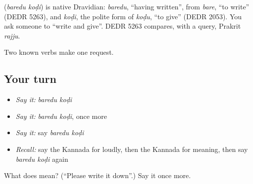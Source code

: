 \begin{cousinweb}
\textbf{ } (\emph{baredu koḍi}) is native Dravidian: \emph{baredu}, \textquotedblleft{}having written\textquotedblright{}, from \emph{bare}, \textquotedblleft{}to write\textquotedblright{} (DEDR 5263), and \emph{koḍi}, the polite form of \emph{koḍu}, \textquotedblleft{}to give\textquotedblright{} (DEDR 2053). You ask someone to \textquotedblleft{}write and give\textquotedblright{}. DEDR 5263 compares, with a query, Prakrit \emph{rajju}.
\end{cousinweb}

\begin{grammarlens}[title={What you've built}]
Two known verbs make one request.
\end{grammarlens}

\subsection*{Your turn}
\begin{itemize}
\raggedright
  \item \emph{Say it:} \emph{baredu koḍi}
  \item \emph{Say it:} \emph{baredu koḍi}, once more
  \item \emph{Say it:} say \emph{baredu koḍi}
  \item \emph{Recall:} say the Kannada for loudly, then the Kannada for meaning, then say \emph{baredu koḍi} again
\end{itemize}

\begin{tcolorbox}[breakable,colback=teal!4,colframe=teal!35!black,title={Before you move on}]
What does   mean? (\textquotedblleft{}Please write it down\textquotedblright{}.) Say it once more.
\end{tcolorbox}
